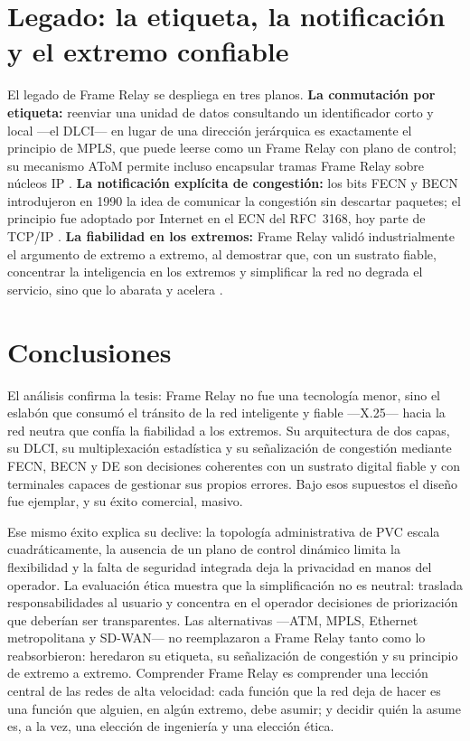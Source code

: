 \documentclass[12pt,a4paper]{article}
\begin{document}
\section{Legado: la etiqueta, la notificación y el extremo confiable}

El legado de Frame Relay se despliega en tres planos. \textbf{La conmutación por etiqueta:} reenviar una unidad de datos consultando un identificador corto y local ---el DLCI--- en lugar de una dirección jerárquica es exactamente el principio de MPLS, que puede leerse como un Frame Relay con plano de control; su mecanismo AToM permite incluso encapsular tramas Frame Relay sobre núcleos IP \cite{rfc3031, davie2000}. \textbf{La notificación explícita de congestión:} los bits FECN y BECN introdujeron en 1990 la idea de comunicar la congestión sin descartar paquetes; el principio fue adoptado por Internet en el ECN del RFC~3168, hoy parte de TCP/IP \cite{rfc3168}. \textbf{La fiabilidad en los extremos:} Frame Relay validó industrialmente el argumento de extremo a extremo, al demostrar que, con un sustrato fiable, concentrar la inteligencia en los extremos y simplificar la red no degrada el servicio, sino que lo abarata y acelera \cite{saltzer1984}.

\section{Conclusiones}

El análisis confirma la tesis: Frame Relay no fue una tecnología menor, sino el eslabón que consumó el tránsito de la red inteligente y fiable ---X.25--- hacia la red neutra que confía la fiabilidad a los extremos. Su arquitectura de dos capas, su DLCI, su multiplexación estadística y su señalización de congestión mediante FECN, BECN y DE son decisiones coherentes con un sustrato digital fiable y con terminales capaces de gestionar sus propios errores. Bajo esos supuestos el diseño fue ejemplar, y su éxito comercial, masivo.

Ese mismo éxito explica su declive: la topología administrativa de PVC escala cuadráticamente, la ausencia de un plano de control dinámico limita la flexibilidad y la falta de seguridad integrada deja la privacidad en manos del operador. La evaluación ética muestra que la simplificación no es neutral: traslada responsabilidades al usuario y concentra en el operador decisiones de priorización que deberían ser transparentes. Las alternativas ---ATM, MPLS, Ethernet metropolitana y SD-WAN--- no reemplazaron a Frame Relay tanto como lo reabsorbieron: heredaron su etiqueta, su señalización de congestión y su principio de extremo a extremo. Comprender Frame Relay es comprender una lección central de las redes de alta velocidad: cada función que la red deja de hacer es una función que alguien, en algún extremo, debe asumir; y decidir quién la asume es, a la vez, una elección de ingeniería y una elección ética.
\end{document}
